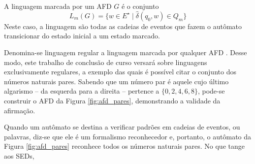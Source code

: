 A linguagem marcada por um AFD $G$ é o conjunto $$L_m(G) = \{ w \in E^\star \mid \hat{\delta}(q_0, w) \in Q_m \}$$ Neste caso, a linguagem são todas as cadeias de eventos que fazem o autômato transicionar do estado inicial a um estado marcado.

Denomina-se linguagem regular a linguagem marcada por qualquer AFD \cite{hopcroft}. Desse modo, este trabalho de conclusão de curso versará sobre linguagens exclusivamente regulares, a exemplo das quais é possível citar o conjunto dos números naturais pares. Sabendo que um número par é aquele cujo último algarismo -- da esquerda para a direita -- pertence a $\{ 0, 2, 4, 6, 8 \}$, pode-se construir o AFD da Figura \ref{fig:afd_pares}, demonstrando a validade da afirmação.


Quando um autômato se destina a verificar padrões em cadeias de eventos, ou palavras, diz-se que ele é um formalismo reconhecedor \cite{menezes} e, portanto, o autômato da Figura \ref{fig:afd_pares} reconhece todos os números naturais pares. No que tange aos \acs{SED}s,  
